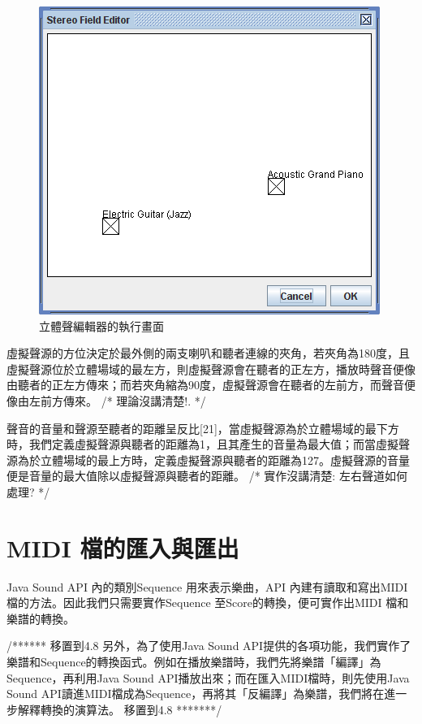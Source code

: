 \documentclass[12pt,a4paper,oneside]{report}
\begin{document}
\begin{figure}[htb]
\centering
\includegraphics[scale=0.3]{img/stereo_editor.png}
\caption{ 立體聲編輯器的執行畫面 }
\label{fig:stereo_editor}
\end{figure}


虛擬聲源的方位決定於最外側的兩支喇叭和聽者連線的夾角，若夾角為180度，且虛擬聲源位於立體場域的最左方，則虛擬聲源會在聽者的正左方，播放時聲音便像由聽者的正左方傳來；而若夾角縮為90度，虛擬聲源會在聽者的左前方，而聲音便像由左前方傳來。  /*
理論沒講清楚!.
*/

聲音的音量和聲源至聽者的距離呈反比[21]，當虛擬聲源為於立體場域的最下方時，我們定義虛擬聲源與聽者的距離為1，且其產生的音量為最大值；而當虛擬聲源為於立體場域的最上方時，定義虛擬聲源與聽者的距離為127。虛擬聲源的音量便是音量的最大值除以虛擬聲源與聽者的距離。 /*
實作沒講清楚: 左右聲道如何處理?
*/

\section{MIDI 檔的匯入與匯出}

Java Sound API 內的類別Sequence 用來表示樂曲，API 內建有讀取和寫出MIDI檔的方法。因此我們只需要實作Sequence 至Score的轉換，便可實作出MIDI 檔和樂譜的轉換。

/******  移置到4.8  
另外，為了使用Java Sound API提供的各項功能，我們實作了樂譜和Sequence的轉換函式。例如在播放樂譜時，我們先將樂譜「編譯」為Sequence，再利用Java Sound API播放出來；而在匯入MIDI檔時，則先使用Java Sound API讀進MIDI檔成為Sequence，再將其「反編譯」為樂譜，我們將在進一步解釋轉換的演算法。
移置到4.8  *******/
\end{document}

